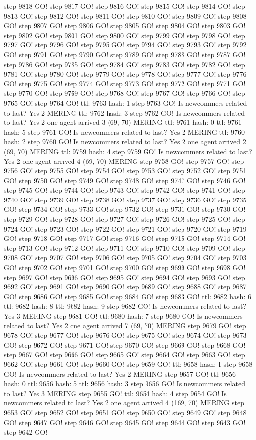 step 9818 GO! step 9817 GO! step 9816 GO! step 9815 GO! step 9814 GO! step 9813 GO! step 9812 GO! step 9811 GO! step 9810 GO! step 9809 GO! step 9808 GO! step 9807 GO! step 9806 GO! step 9805 GO! step 9804 GO! step 9803 GO! step 9802 GO! step 9801 GO! step 9800 GO! step 9799 GO! step 9798 GO! step 9797 GO! step 9796 GO! step 9795 GO! step 9794 GO! step 9793 GO! step 9792 GO! step 9791 GO! step 9790 GO! step 9789 GO! step 9788 GO! step 9787 GO! step 9786 GO! step 9785 GO! step 9784 GO! step 9783 GO! step 9782 GO! step 9781 GO! step 9780 GO! step 9779 GO! step 9778 GO! step 9777 GO! step 9776 GO! step 9775 GO! step 9774 GO! step 9773 GO! step 9772 GO! step 9771 GO! step 9770 GO! step 9769 GO! step 9768 GO! step 9767 GO! step 9766 GO! step 9765 GO! step 9764 GO! ttl: 9763 hash: 1 step 9763 GO! Is newcommers related to last? Yes 2 MERING ttl: 9762 hash: 3 step 9762 GO! Is newcommers related to last? Yes 2 one agent arrived 3 (69, 70) MERING ttl: 9761 hash: 0 ttl: 9761 hash: 5 step 9761 GO! Is newcommers related to last? Yes 2 MERING ttl: 9760 hash: 2 step 9760 GO! Is newcommers related to last? Yes 2 one agent arrived 2 (69, 70) MERING ttl: 9759 hash: 4 step 9759 GO! Is newcommers related to last? Yes 2 one agent arrived 4 (69, 70) MERING step 9758 GO! step 9757 GO! step 9756 GO! step 9755 GO! step 9754 GO! step 9753 GO! step 9752 GO! step 9751 GO! step 9750 GO! step 9749 GO! step 9748 GO! step 9747 GO! step 9746 GO! step 9745 GO! step 9744 GO! step 9743 GO! step 9742 GO! step 9741 GO! step 9740 GO! step 9739 GO! step 9738 GO! step 9737 GO! step 9736 GO! step 9735 GO! step 9734 GO! step 9733 GO! step 9732 GO! step 9731 GO! step 9730 GO! step 9729 GO! step 9728 GO! step 9727 GO! step 9726 GO! step 9725 GO! step 9724 GO! step 9723 GO! step 9722 GO! step 9721 GO! step 9720 GO! step 9719 GO! step 9718 GO! step 9717 GO! step 9716 GO! step 9715 GO! step 9714 GO! step 9713 GO! step 9712 GO! step 9711 GO! step 9710 GO! step 9709 GO! step 9708 GO! step 9707 GO! step 9706 GO! step 9705 GO! step 9704 GO! step 9703 GO! step 9702 GO! step 9701 GO! step 9700 GO! step 9699 GO! step 9698 GO! step 9697 GO! step 9696 GO! step 9695 GO! step 9694 GO! step 9693 GO! step 9692 GO! step 9691 GO! step 9690 GO! step 9689 GO! step 9688 GO! step 9687 GO! step 9686 GO! step 9685 GO! step 9684 GO! step 9683 GO! ttl: 9682 hash: 6 ttl: 9682 hash: 8 ttl: 9682 hash: 9 step 9682 GO! Is newcommers related to last? Yes 3 MERING step 9681 GO! ttl: 9680 hash: 7 step 9680 GO! Is newcommers related to last? Yes 2 one agent arrived 7 (69, 70) MERING step 9679 GO! step 9678 GO! step 9677 GO! step 9676 GO! step 9675 GO! step 9674 GO! step 9673 GO! step 9672 GO! step 9671 GO! step 9670 GO! step 9669 GO! step 9668 GO! step 9667 GO! step 9666 GO! step 9665 GO! step 9664 GO! step 9663 GO! step 9662 GO! step 9661 GO! step 9660 GO! step 9659 GO! ttl: 9658 hash: 1 step 9658 GO! Is newcommers related to last? Yes 2 MERING step 9657 GO! ttl: 9656 hash: 0 ttl: 9656 hash: 5 ttl: 9656 hash: 3 step 9656 GO! Is newcommers related to last? Yes 3 MERING step 9655 GO! ttl: 9654 hash: 4 step 9654 GO! Is newcommers related to last? Yes 2 one agent arrived 4 (169, 70) MERING step 9653 GO! step 9652 GO! step 9651 GO! step 9650 GO! step 9649 GO! step 9648 GO! step 9647 GO! step 9646 GO! step 9645 GO! step 9644 GO! step 9643 GO! step 9642 GO! 